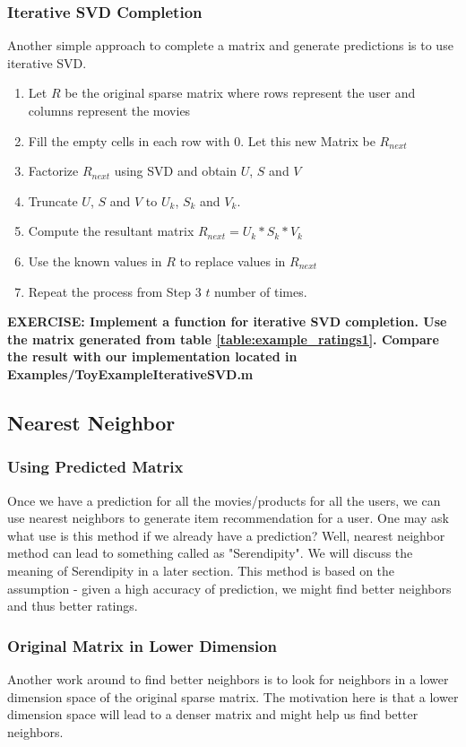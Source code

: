   \subsubsection{Iterative SVD Completion}
  Another simple approach to complete a matrix and generate predictions is to use iterative SVD. 
  \begin{enumerate}
    \item Let $R$ be the original sparse matrix where rows represent the user and columns represent the movies
    \item Fill the empty cells in each row with 0. Let this new Matrix be $R_{next}$
    \item Factorize $R_{next}$ using SVD and obtain $U$, $S$ and $V$
    \item Truncate $U$, $S$ and $V$ to $U_k$, $S_k$ and $V_k$.
    \item Compute the resultant matrix $R_{next} = U_k*S_k*V_k$
    \item Use the known values in $R$ to replace values in $R_{next}$
    \item Repeat the process from Step 3 $t$ number of times.
  \end{enumerate}
  \textbf{EXERCISE: Implement a function for iterative SVD completion. Use the matrix generated from table \ref{table:example_ratings1}. Compare the result with our implementation located in Examples/ToyExampleIterativeSVD.m}
  \subsection{Nearest Neighbor}
  \subsubsection{Using Predicted Matrix}
  Once we have a prediction for all the movies/products for all the users, we can use nearest neighbors to generate item recommendation for a user. One may ask what use is this method if we already have a prediction? Well, nearest neighbor method can lead to something called as "Serendipity". We will discuss the meaning of Serendipity in a later section. This method is based on the assumption - given a high accuracy of prediction, we might find better neighbors and thus better ratings.
  \subsubsection{Original Matrix in Lower Dimension}
  Another work around to find better neighbors is to look for neighbors in a lower dimension space of the original sparse matrix. The motivation here is that a lower dimension space will lead to a denser matrix and might help us find better neighbors.

